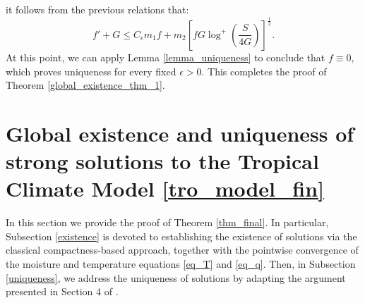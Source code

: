 \documentclass[11pt, a4paper, article,reqno,]{amsart}
\theoremstyle{remark}
\numberwithin{equation}{section}
\begin{document}
it follows from the previous relations that:
\begin{equation*}
    f' + G \leq C_\epsilon m_1 f + m_2\left[ f G \log^+ \left(\frac{S}{4G} \right)\right]^{\frac{1}{2}}.
\end{equation*}
At this point, we can apply Lemma \ref{lemma_uniqueness} to conclude that $f \equiv 0$, which proves uniqueness for every fixed $\epsilon > 0$. This completes the proof of Theorem \ref{global_existence_thm_1}.
 










\section{Global existence and uniqueness of strong solutions to the Tropical Climate Model \eqref{tro_model_fin}}\label{sec:6}


In this section we provide the proof of Theorem \ref{thm_final}. In particular, Subsection \ref{existence} is devoted to establishing the existence of solutions via the classical compactness-based approach, together with the pointwise convergence of the moisture and temperature equations \eqref{eq_T} and \eqref{eq_q}. Then, in Subsection \ref{uniqueness}, we address the uniqueness of solutions by adapting the argument presented in Section 4 of \cite{LT}.
\end{document}
